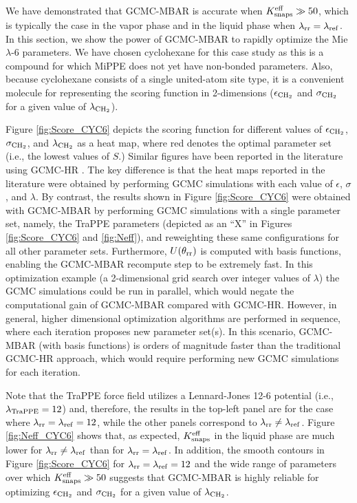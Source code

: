 \documentclass[journal=jced,manuscript=article]{achemso}
\begin{document}
We have demonstrated that GCMC-MBAR is accurate when $K_{\rm snaps}^{\rm eff} \gg 50$, which is typically the case in the vapor phase and in the liquid phase when $\lambda_{\rm rr} = \lambda_{\rm ref}$. In this section, we show the power of GCMC-MBAR to rapidly optimize the Mie $\lambda$-6 parameters. We have chosen cyclohexane for this case study as this is a compound for which MiPPE does not yet have non-bonded parameters. Also, because cyclohexane consists of a single united-atom site type, it is a convenient molecule for representing the scoring function in 2-dimensions ($\epsilon_{\rm CH_2}$ and $\sigma_{\rm CH_2}$ for a given value of $\lambda_{\rm CH_2}$).

Figure \ref{fig:Score_CYC6} depicts the scoring function for different values of $\epsilon_{\rm CH_2}$, $\sigma_{\rm CH_2}$, and $\lambda_{\rm CH_2}$ as a heat map, where red denotes the optimal parameter set (i.e., the lowest values of $S$.) Similar figures have been reported in the literature using GCMC-HR \cite{Potoff_branched,Barhaghi2017}. The key difference is that the heat maps reported in the literature were obtained by performing GCMC simulations with each value of $\epsilon$, $\sigma$, and $\lambda$. By contrast, the results shown in Figure \ref{fig:Score_CYC6} were obtained with GCMC-MBAR by performing GCMC simulations with a single parameter set, namely, the TraPPE parameters (depicted as an ``X'' in Figures \ref{fig:Score_CYC6} and \ref{fig:Neff}), and reweighting these same configurations for all other parameter sets. Furthermore, $U(\theta_{\rm rr})$ is computed with basis functions, enabling the GCMC-MBAR recompute step to be extremely fast. In this optimization example (a 2-dimensional grid search over integer values of $\lambda$) the GCMC simulations could be run in parallel, which would negate the computational gain of GCMC-MBAR compared with GCMC-HR. However, in general, higher dimensional optimization algorithms are performed in sequence, where each iteration proposes new parameter set(s). In this scenario, GCMC-MBAR (with basis functions) is orders of magnitude faster than the traditional GCMC-HR approach, which would require performing new GCMC simulations for each iteration. 

Note that the TraPPE force field utilizes a Lennard-Jones 12-6 potential (i.e., $\lambda_{\rm TraPPE} = 12$) and, therefore, the results in the top-left panel are for the case where $\lambda_{\rm rr} = \lambda_{\rm ref} = 12$, while the other panels correspond to $\lambda_{\rm rr} \neq \lambda_{\rm ref}$. Figure \ref{fig:Neff_CYC6} shows that, as expected, $K_{\rm snaps}^{\rm eff}$ in the liquid phase are much lower for $\lambda_{\rm rr} \neq \lambda_{\rm ref}$ than for $\lambda_{\rm rr} = \lambda_{\rm ref}$. In addition, the smooth contours in Figure \ref{fig:Score_CYC6} for $\lambda_{\rm rr} = \lambda_{\rm ref} = 12$ and the wide range of parameters over which $K_{\rm snaps}^{\rm eff} \gg 50$ suggests that GCMC-MBAR is highly reliable for optimizing $\epsilon_{\rm CH_2}$ and $\sigma_{\rm CH_2}$ for a given value of $\lambda_{\rm CH_2}$.  
\end{document}
